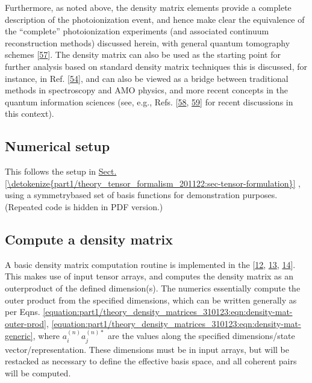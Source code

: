 \documentclass[letterpaper,table,10pt,english]{jupyterBook}
\begin{document}
\sphinxAtStartPar
Furthermore, as noted above, the density matrix elements provide a complete description of the photoionization event, and hence make clear the equivalence of the “complete” photoionization experiments (and associated continuum reconstruction methods) discussed herein, with general quantum tomography schemes {[}\hyperlink{cite.backmatter/bibliography:id707}{57}{]}. The density matrix can also be used as the starting point for further analysis based on standard density matrix techniques \sphinxhyphen{} this is discussed, for instance, in Ref. {[}\hyperlink{cite.backmatter/bibliography:id479}{54}{]}, and can also be viewed as a bridge between traditional methods in spectroscopy and AMO physics, and more recent concepts in the quantum information sciences (see, e.g., Refs. {[}\hyperlink{cite.backmatter/bibliography:id827}{58}, \hyperlink{cite.backmatter/bibliography:id878}{59}{]} for recent discussions in this context).


\subsection{Numerical setup}
\label{\detokenize{part1/theory_density_matrices_310123:numerical-setup}}
\sphinxAtStartPar
This follows the setup in \hyperref[\detokenize{part1/theory_tensor_formalism_201122:sec-tensor-formulation}]{Sect.\@ \ref{\detokenize{part1/theory_tensor_formalism_201122:sec-tensor-formulation}}} {\hyperref[\detokenize{part1/theory_tensor_formalism_201122:sec-tensor-formulation}]{}}, using a symmetry\sphinxhyphen{}based set of basis functions for demonstration purposes. (Repeated code is hidden in PDF version.)


\subsection{Compute a density matrix}
\label{\detokenize{part1/theory_density_matrices_310123:compute-a-density-matrix}}
\sphinxAtStartPar
A basic density matrix computation routine is implemented in the  {[}\hyperlink{cite.backmatter/bibliography:id605}{12}, \hyperlink{cite.backmatter/bibliography:id547}{13}, \hyperlink{cite.backmatter/bibliography:id545}{14}{]}. This makes use of input tensor arrays, and computes the density matrix as an outer\sphinxhyphen{}product of the defined dimension(s). The numerics essentially compute the outer product from the specified dimensions, which can be written generally as per Eqns. \eqref{equation:part1/theory_density_matrices_310123:eqn:density-mat-outer-prod}, \eqref{equation:part1/theory_density_matrices_310123:eqn:density-mat-generic}, where \(a_{i}^{(n)}a_{j}^{(n)*}\) are the values along the specified dimensions/state vector/representation. These dimensions must be in input arrays, but will be restacked as necessary to define the effective basis space, and all coherent pairs will be computed.
\end{document}
